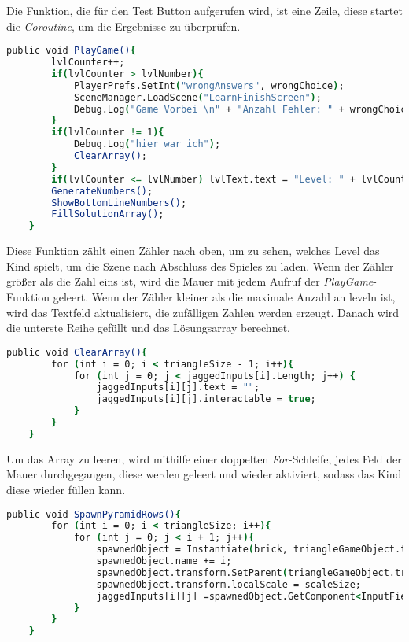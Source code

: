 Die Funktion, die für den Test Button aufgerufen wird, ist eine Zeile, diese startet die \textit{Coroutine}, um die Ergebnisse zu überprüfen.\\
\begin{lstlisting}[language=csh, caption={Triangle.cs PlayGame-Funktion}]
	public void PlayGame(){
		lvlCounter++;
		if(lvlCounter > lvlNumber){
			PlayerPrefs.SetInt("wrongAnswers", wrongChoice);
			SceneManager.LoadScene("LearnFinishScreen");
			Debug.Log("Game Vorbei \n" + "Anzahl Fehler: " + wrongChoice);
		}
		if(lvlCounter != 1){
			Debug.Log("hier war ich");
			ClearArray();
		}
		if(lvlCounter <= lvlNumber)	lvlText.text = "Level: " + lvlCounter + "/" + lvlNumber;
		GenerateNumbers();
		ShowBottomLineNumbers();
		FillSolutionArray();
	}
\end{lstlisting}
Diese Funktion zählt einen Zähler nach oben, um zu sehen, welches Level das Kind spielt, um die Szene nach Abschluss des Spieles zu laden. Wenn der Zähler größer als die Zahl eins ist, wird die Mauer mit jedem Aufruf der \textit{PlayGame}-Funktion geleert. Wenn der Zähler kleiner als die maximale Anzahl an leveln ist, wird das Textfeld aktualisiert, die zufälligen Zahlen werden erzeugt. Danach wird die unterste Reihe gefüllt und das Lösungsarray berechnet.\\ 
\begin{lstlisting}[language=csh, caption={Triangle.cs ClearArray-Funktion}]
	public void ClearArray(){
		for (int i = 0; i < triangleSize - 1; i++){
			for (int j = 0; j < jaggedInputs[i].Length; j++) {
				jaggedInputs[i][j].text = "";
				jaggedInputs[i][j].interactable = true;
			}
		}
	}
\end{lstlisting}
Um das Array zu leeren, wird mithilfe einer doppelten \textit{For}-Schleife, jedes Feld der Mauer durchgegangen, diese werden geleert und wieder aktiviert, sodass das Kind diese wieder füllen kann.\\
\begin{lstlisting}[language=csh, caption={Triangle.cs SpawnPyramidRows-Funktion}]
	public void SpawnPyramidRows(){
		for (int i = 0; i < triangleSize; i++){
			for (int j = 0; j < i + 1; j++){
				spawnedObject = Instantiate(brick, triangleGameObject.transform.position, Quaternion.identity);
				spawnedObject.name += i;
				spawnedObject.transform.SetParent(triangleGameObject.transform.GetChild(i));
				spawnedObject.transform.localScale = scaleSize;
				jaggedInputs[i][j] =spawnedObject.GetComponent<InputField>();
			}
		}
	}
\end{lstlisting}
